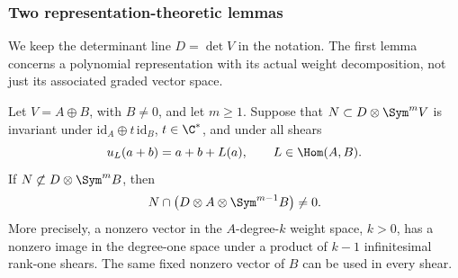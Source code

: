 \subsubsection{Two representation-theoretic lemmas}

We keep the determinant line \(D=\det V\) in the notation.
The first lemma concerns a polynomial representation with its actual
weight decomposition, not just its associated graded vector space.

\begin{lemma}
\label{lem:shear-descent}
Let \(V=A\oplus B\), with \(B\ne0\), and let \(m\ge1\).
Suppose that \(N\subset D\otimes\Sym^mV\) is invariant under
\(\mathrm{id}_A\oplus t\,\mathrm{id}_B\), \(t\in\C^*\),
and under all shears
\[
 u_L(a+b)=a+b+L(a),\qquad L\in\Hom(A,B).
\]
If \(N\not\subset D\otimes\Sym^mB\), then
\[
 N\cap\bigl(D\otimes A\otimes\Sym^{m-1}B\bigr)\ne0.
\]
More precisely, a nonzero vector in the \(A\)-degree-\(k\)
weight space, \(k>0\), has a nonzero image in the degree-one
space under a product of \(k-1\) infinitesimal rank-one shears.
The same fixed nonzero vector of \(B\) can be used in every shear.
\end{lemma}
